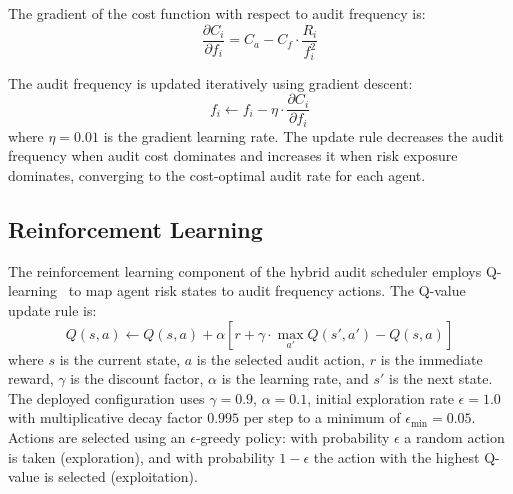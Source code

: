 \par \vspace{0.25cm}
\noindent
The gradient of the cost function with respect to audit frequency is:
\begin{equation}
\frac{\partial C_i}{\partial f_i} = C_a - C_f \cdot \frac{R_i}{f_i^2}
\label{eq:grad}
\end{equation}

\par \vspace{0.25cm}
\noindent
The audit frequency is updated iteratively using gradient descent:
\begin{equation}
f_i \leftarrow f_i - \eta \cdot \frac{\partial C_i}{\partial f_i}
\label{eq:update}
\end{equation}
where $\eta = 0.01$ is the gradient learning rate. The update rule decreases the audit frequency when audit cost dominates and increases it when risk exposure dominates, converging to the cost-optimal audit rate for each agent.

\subsection{Reinforcement Learning}
\label{sec:rl}

The reinforcement learning component of the hybrid audit scheduler employs Q-learning~\cite{priyadarsini2025,ibrahim2023security} to map agent risk states to audit frequency actions. The Q-value update rule is:
\begin{equation}
Q(s, a) \leftarrow Q(s, a) + \alpha \left[ r + \gamma \cdot \max_{a'} Q(s', a') - Q(s, a) \right]
\label{eq:q}
\end{equation}
where $s$ is the current state, $a$ is the selected audit action, $r$ is the immediate reward, $\gamma$ is the discount factor, $\alpha$ is the learning rate, and $s'$ is the next state. The deployed configuration uses $\gamma = 0.9$, $\alpha = 0.1$, initial exploration rate $\epsilon = 1.0$ with multiplicative decay factor $0.995$ per step to a minimum of $\epsilon_{\min} = 0.05$. Actions are selected using an $\epsilon$-greedy policy: with probability $\epsilon$ a random action is taken (exploration), and with probability $1-\epsilon$ the action with the highest Q-value is selected (exploitation).

